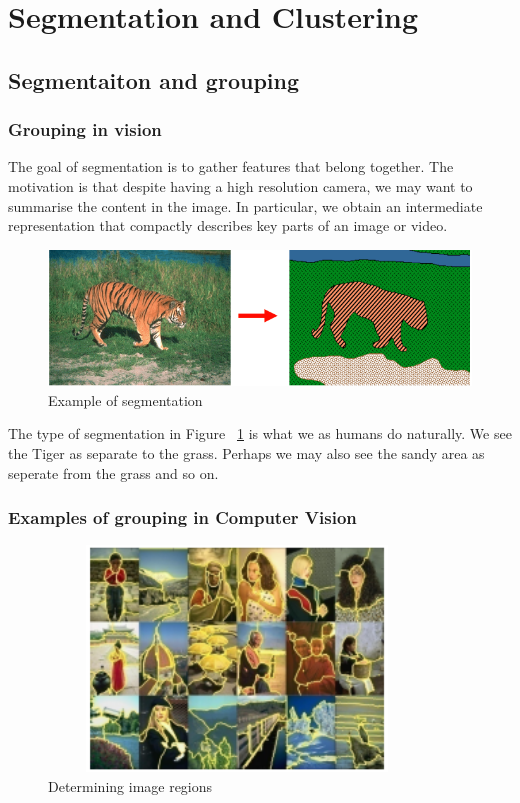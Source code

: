 \documentclass{article}
\begin{document}
\section{Segmentation and Clustering}
\subsection{Segmentaiton and grouping}
\subsubsection{Grouping in vision}
The goal of segmentation is to gather features that belong together. The motivation is that despite having a high resolution camera, we may want to summarise the content in the image. In particular, we obtain an intermediate representation that compactly describes key parts of an image or video.

\begin{figure}[htp]
    \centering
    \includegraphics[width=12cm]{7_slide_4}
    \caption{Example of segmentation}
    \label{fig:TigerSeg}
\end{figure}

The type of segmentation in Figure ~\ref{fig:TigerSeg} is what we as humans do naturally. We see the Tiger as separate to the grass. Perhaps we may also see the sandy area as seperate from the grass and so on.

\subsubsection{Examples of grouping in Computer Vision}
\begin{figure}[htp]
    \centering
    \includegraphics[width=10cm, height=6cm]{slide_5_3}
    \caption{Determining image regions}
    \label{fig:Slide5_3}
\end{figure}
\end{document}
